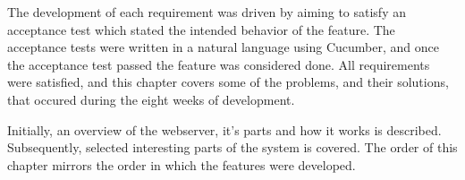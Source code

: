 
The development of each requirement was driven by
aiming to satisfy an acceptance test which stated the intended behavior of the feature.
The acceptance tests were written in a natural language using Cucumber, and
once the acceptance test passed the feature was considered done. All
requirements were satisfied, and this chapter covers some of the problems, and
their solutions, that occured during the eight weeks of development.

Initially, an overview of the webserver, it's parts and how it works is
described. Subsequently, selected interesting parts of the system is covered.
The order of this chapter mirrors the order in which the features were
developed.
